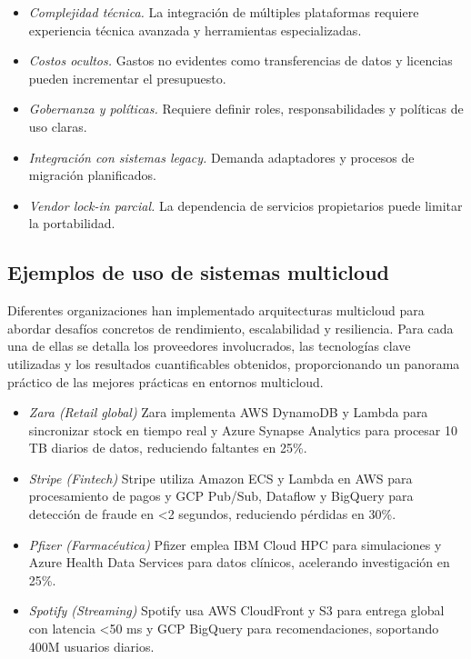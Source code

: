 {            \begin{itemize}
                \item \textit{Complejidad técnica.} La integración de múltiples plataformas requiere experiencia técnica avanzada y herramientas especializadas.
                \item \textit{Costos ocultos.} Gastos no evidentes como transferencias de datos y licencias pueden incrementar el presupuesto.
                \item \textit{Gobernanza y políticas.} Requiere definir roles, responsabilidades y políticas de uso claras.
                \item \textit{Integración con sistemas legacy.} Demanda adaptadores y procesos de migración planificados.
                \item \textit{Vendor lock-in parcial.} La dependencia de servicios propietarios puede limitar la portabilidad.
            \end{itemize}
            
        \subsection{Ejemplos de uso de sistemas multicloud}
            Diferentes organizaciones han implementado arquitecturas multicloud para abordar desafíos concretos de rendimiento, escalabilidad y resiliencia. Para cada una de ellas se detalla los proveedores involucrados, las tecnologías clave utilizadas y los resultados cuantificables obtenidos, proporcionando un panorama práctico de las mejores prácticas en entornos multicloud.
            
            \begin{itemize}
                \item \textit{Zara (Retail global)} Zara implementa AWS DynamoDB y Lambda para sincronizar stock en tiempo real y Azure Synapse Analytics para procesar 10 TB diarios de datos, reduciendo faltantes en 25\%.
                \item \textit{Stripe (Fintech)} Stripe utiliza Amazon ECS y Lambda en AWS para procesamiento de pagos y GCP Pub/Sub, Dataflow y BigQuery para detección de fraude en <2 segundos, reduciendo pérdidas en 30\%.
                \item \textit{Pfizer (Farmacéutica)} Pfizer emplea IBM Cloud HPC para simulaciones y Azure Health Data Services para datos clínicos, acelerando investigación en 25\%.
                \item \textit{Spotify (Streaming)} Spotify usa AWS CloudFront y S3 para entrega global con latencia <50 ms y GCP BigQuery para recomendaciones, soportando 400M usuarios diarios.
            \end{itemize}
            
}
